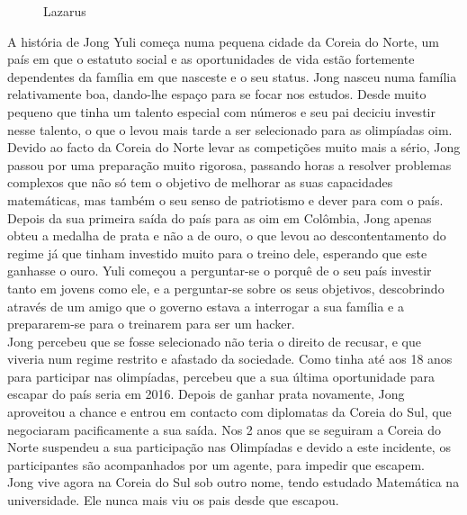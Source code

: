 \documentclass{report}
\begin{document}
\begin{figure}[h]
    \center
    \caption{Lazarus}
    \label{lazarus}
\end{figure}

A história de Jong Yuli começa numa pequena cidade da Coreia do Norte, um país em que o estatuto social e as oportunidades de vida estão fortemente dependentes da família em que nasceste e o seu status. Jong nasceu numa família relativamente boa, dando-lhe espaço para se focar nos estudos. Desde muito pequeno que tinha um talento especial com números e seu pai deciciu investir nesse talento, o que o levou mais tarde a ser selecionado para as olimpíadas \ac{oim}. Devido ao facto da Coreia do Norte levar as competições muito mais a sério, Jong passou por uma preparação muito rigorosa, passando horas a resolver problemas complexos que não só tem o objetivo de melhorar as suas capacidades matemáticas, mas também o seu senso de patriotismo e dever para com o país.\\ \indent Depois da sua primeira saída do país para as \ac{oim} em Colômbia, Jong apenas obteu a medalha de prata e não a de ouro, o que levou ao descontentamento do regime já que tinham investido muito para o treino dele, esperando que este ganhasse o ouro. Yuli começou a perguntar-se o porquê de o seu país investir tanto em jovens como ele, e a perguntar-se sobre os seus objetivos, descobrindo através de um amigo que o governo estava a interrogar a sua família e a prepararem-se para o treinarem para ser um hacker.\\ \indent Jong percebeu que se fosse selecionado não teria o direito de recusar, e que viveria num regime restrito e afastado da sociedade. Como tinha até aos 18 anos para participar nas olimpíadas, percebeu que a sua última oportunidade para escapar do país seria em 2016. Depois de ganhar prata novamente, Jong aproveitou a chance e entrou em contacto com diplomatas da Coreia do Sul, que negociaram pacificamente a sua saída. Nos 2 anos que se seguiram a Coreia do Norte suspendeu a sua participação nas Olimpíadas e devido a este incidente, os participantes são acompanhados por um agente, para impedir que escapem.\\ \indent Jong vive agora na Coreia do Sul sob outro nome, tendo estudado Matemática na universidade. Ele nunca mais viu os pais desde que escapou.
\end{document}
